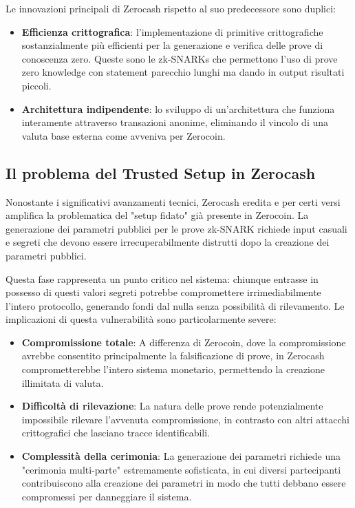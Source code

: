 Le innovazioni principali di Zerocash rispetto al suo predecessore sono duplici:
\begin{itemize}
    \item \textbf{Efficienza crittografica}: l'implementazione di primitive crittografiche sostanzialmente più efficienti per la generazione e verifica delle prove di conoscenza zero. Queste sono le zk-SNARKs che permettono l'uso di prove zero knowledge con statement parecchio lunghi ma dando in output risultati piccoli.
    \item \textbf{Architettura indipendente}: lo sviluppo di un'architettura che funziona interamente attraverso transazioni anonime, eliminando il vincolo di una valuta base esterna come avveniva per Zerocoin.
\end{itemize}

\subsection{Il problema del Trusted Setup in Zerocash}

Nonostante i significativi avanzamenti tecnici, Zerocash eredita e per certi versi amplifica la problematica del "setup fidato" già presente in Zerocoin. La generazione dei parametri pubblici per le prove zk-SNARK richiede input casuali e segreti che devono essere irrecuperabilmente distrutti dopo la creazione dei parametri pubblici.

Questa fase rappresenta un punto critico nel sistema: chiunque entrasse in possesso di questi valori segreti potrebbe compromettere irrimediabilmente l'intero protocollo, generando fondi dal nulla senza possibilità di rilevamento. Le implicazioni di questa vulnerabilità sono particolarmente severe:

\begin{itemize}
    \item \textbf{Compromissione totale}: A differenza di Zerocoin, dove la compromissione avrebbe consentito principalmente la falsificazione di prove, in Zerocash comprometterebbe l'intero sistema monetario, permettendo la creazione illimitata di valuta.
    \item \textbf{Difficoltà di rilevazione}: La natura delle prove rende potenzialmente impossibile rilevare l'avvenuta compromissione, in contrasto con altri attacchi crittografici che lasciano tracce identificabili.
    \item \textbf{Complessità della cerimonia}: La generazione dei parametri richiede una "cerimonia multi-parte" estremamente sofisticata, in cui diversi partecipanti contribuiscono alla creazione dei parametri in modo che tutti debbano essere compromessi per danneggiare il sistema.
\end{itemize}

